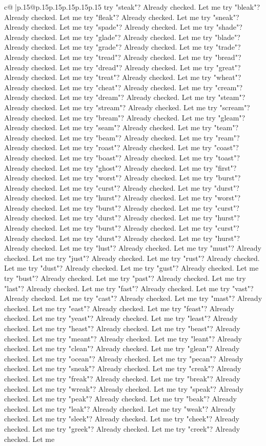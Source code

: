 \documentclass{article}
\begin{document}
{\begin{supertabular}{c@{$\;$}|p{.15\linewidth}@{}p{.15\linewidth}p{.15\linewidth}p{.15\linewidth}p{.15\linewidth}p{.15\linewidth}}
{{{try "steak"? Already checked. Let me try "bleak"? Already checked. Let me try "fleak"? Already checked. Let me try "sneak"? Already checked. Let me try "spade"? Already checked. Let me try "shade"? Already checked. Let me try "glade"? Already checked. Let me try "blade"? Already checked. Let me try "grade"? Already checked. Let me try "trade"? Already checked. Let me try "tread"? Already checked. Let me try "bread"? Already checked. Let me try "dread"? Already checked. Let me try "great"? Already checked. Let me try "treat"? Already checked. Let me try "wheat"? Already checked. Let me try "cheat"? Already checked. Let me try "cream"? Already checked. Let me try "dream"? Already checked. Let me try "steam"? Already checked. Let me try "stream"? Already checked. Let me try "scream"? Already checked. Let me try "bream"? Already checked. Let me try "gleam"? Already checked. Let me try "seam"? Already checked. Let me try "team"? Already checked. Let me try "beam"? Already checked. Let me try "ream"? Already checked. Let me try "roast"? Already checked. Let me try "coast"? Already checked. Let me try "boast"? Already checked. Let me try "toast"? Already checked. Let me try "ghost"? Already checked. Let me try "first"? Already checked. Let me try "worst"? Already checked. Let me try "burst"? Already checked. Let me try "curst"? Already checked. Let me try "durst"? Already checked. Let me try "hurst"? Already checked. Let me try "worst"? Already checked. Let me try "burst"? Already checked. Let me try "curst"? Already checked. Let me try "durst"? Already checked. Let me try "hurst"? Already checked. Let me try "burst"? Already checked. Let me try "curst"? Already checked. Let me try "durst"? Already checked. Let me try "hurst"? Already checked. Let me try "lust"? Already checked. Let me try "must"? Already checked. Let me try "just"? Already checked. Let me try "rust"? Already checked. Let me try "dust"? Already checked. Let me try "gust"? Already checked. Let me try "bust"? Already checked. Let me try "past"? Already checked. Let me try "last"? Already checked. Let me try "fast"? Already checked. Let me try "vast"? Already checked. Let me try "cast"? Already checked. Let me try "mast"? Already checked. Let me try "east"? Already checked. Let me try "feast"? Already checked. Let me try "yeast"? Already checked. Let me try "least"? Already checked. Let me try "heast"? Already checked. Let me try "beast"? Already checked. Let me try "meant"? Already checked. Let me try "leant"? Already checked. Let me try "clean"? Already checked. Let me try "glean"? Already checked. Let me try "ocean"? Already checked. Let me try "pecan"? Already checked. Let me try "sneak"? Already checked. Let me try "creak"? Already checked. Let me try "freak"? Already checked. Let me try "break"? Already checked. Let me try "wreak"? Already checked. Let me try "speak"? Already checked. Let me try "peak"? Already checked. Let me try "beak"? Already checked. Let me try "leak"? Already checked. Let me try "weak"? Already checked. Let me try "sleek"? Already checked. Let me try "cheek"? Already checked. Let me try "greek"? Already checked. Let me try "creek"? Already checked. Let me }}}
\end{supertabular}}
\end{document}
